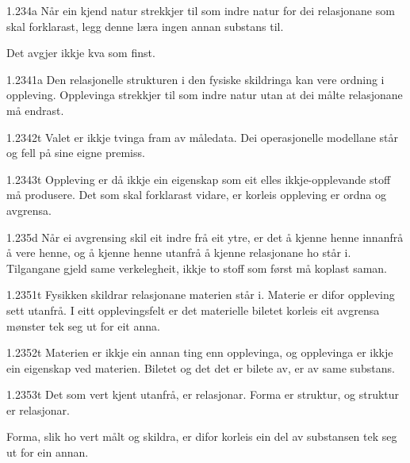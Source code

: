 \begin{formproposition}{1.234}{a}
Når ein kjend natur strekkjer til som indre natur for dei relasjonane som skal forklarast, legg denne læra ingen annan substans til.

Det avgjer ikkje kva som finst.
\end{formproposition}

\begin{formproposition}{1.2341}{a}
Den relasjonelle strukturen i den fysiske skildringa kan vere ordning i oppleving. Opplevinga strekkjer til som indre natur utan at dei målte relasjonane må endrast.
\end{formproposition}

\begin{formproposition}{1.2342}{t}
Valet er ikkje tvinga fram av måledata. Dei operasjonelle modellane står og fell på sine eigne premiss.
\end{formproposition}

\begin{formproposition}{1.2343}{t}
Oppleving er då ikkje ein eigenskap som eit elles ikkje-opplevande stoff må produsere. Det som skal forklarast vidare, er korleis oppleving er ordna og avgrensa.
\end{formproposition}

\begin{formproposition}{1.235}{d}
Når ei avgrensing skil eit indre frå eit ytre, er det å kjenne henne innanfrå å vere henne, og å kjenne henne utanfrå å kjenne relasjonane ho står i. Tilgangane gjeld same verkelegheit, ikkje to stoff som først må koplast saman.
\end{formproposition}

\begin{formproposition}{1.2351}{t}
Fysikken skildrar relasjonane materien står i. Materie er difor oppleving sett utanfrå. I eitt opplevingsfelt er det materielle biletet korleis eit avgrensa mønster tek seg ut for eit anna.
\end{formproposition}

\begin{formproposition}{1.2352}{t}
Materien er ikkje ein annan ting enn opplevinga, og opplevinga er ikkje ein eigenskap ved materien. Biletet og det det er bilete av, er av same substans.
\end{formproposition}

\begin{formproposition}{1.2353}{t}
Det som vert kjent utanfrå, er relasjonar. Forma er struktur, og struktur er relasjonar.

Forma, slik ho vert målt og skildra, er difor korleis ein del av substansen tek seg ut for ein annan.
\end{formproposition}

